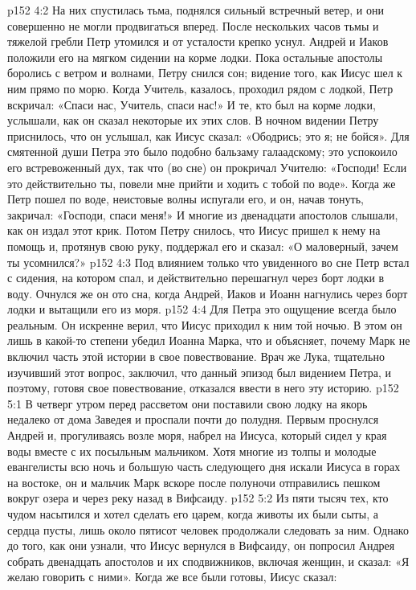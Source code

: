 \vs p152 4:2 На них спустилась тьма, поднялся сильный встречный ветер, и они совершенно не могли продвигаться вперед. После нескольких часов тьмы и тяжелой гребли Петр утомился и от усталости крепко уснул. Андрей и Иаков положили его на мягком сидении на корме лодки. Пока остальные апостолы боролись с ветром и волнами, Петру снился сон; видение того, как Иисус шел к ним прямо по морю. Когда Учитель, казалось, проходил рядом с лодкой, Петр вскричал: «Спаси нас, Учитель, спаси нас!» И те, кто был на корме лодки, услышали, как он сказал некоторые их этих слов. В ночном видении Петру приснилось, что он услышал, как Иисус сказал: «Ободрись; это я; не бойся». Для смятенной души Петра это было подобно бальзаму галаадскому; это успокоило его встревоженный дух, так что (во сне) он прокричал Учителю: «Господи! Если это действительно ты, повели мне прийти и ходить с тобой по воде». Когда же Петр пошел по воде, неистовые волны испугали его, и он, начав тонуть, закричал: «Господи, спаси меня!» И многие из двенадцати апостолов слышали, как он издал этот крик. Потом Петру снилось, что Иисус пришел к нему на помощь и, протянув свою руку, поддержал его и сказал: «О маловерный, зачем ты усомнился?»
\vs p152 4:3 Под влиянием только что увиденного во сне Петр встал с сидения, на котором спал, и действительно перешагнул через борт лодки в воду. Очнулся же он ото сна, когда Андрей, Иаков и Иоанн нагнулись через борт лодки и вытащили его из моря.
\vs p152 4:4 Для Петра это ощущение всегда было реальным. Он искренне верил, что Иисус приходил к ним той ночью. В этом он лишь в какой\hyp{}то степени убедил Иоанна Марка, что и объясняет, почему Марк не включил часть этой истории в свое повествование. Врач же Лука, тщательно изучивший этот вопрос, заключил, что данный эпизод был видением Петра, и поэтому, готовя свое повествование, отказался ввести в него эту историю.
\vs p152 5:1 В четверг утром перед рассветом они поставили свою лодку на якорь недалеко от дома Заведея и проспали почти до полудня. Первым проснулся Андрей и, прогуливаясь возле моря, набрел на Иисуса, который сидел у края воды вместе с их посыльным мальчиком. Хотя многие из толпы и молодые евангелисты всю ночь и большую часть следующего дня искали Иисуса в горах на востоке, он и мальчик Марк вскоре после полуночи отправились пешком вокруг озера и через реку назад в Вифсаиду.
\vs p152 5:2 \pc Из пяти тысяч тех, кто чудом насытился и хотел сделать его царем, когда животы их были сыты, а сердца пусты, лишь около пятисот человек продолжали следовать за ним. Однако до того, как они узнали, что Иисус вернулся в Вифсаиду, он попросил Андрея собрать двенадцать апостолов и их сподвижников, включая женщин, и сказал: «Я желаю говорить с ними». Когда же все были готовы, Иисус сказал:
